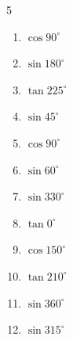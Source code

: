 \begin{multicols}{5}
\begin{enumerate}

  \item $\displaystyle \cos{90^\circ}$

        \phantom{$\displaystyle =0$}

  \item $\displaystyle \sin{180^\circ}$

        \phantom{$\displaystyle =0$}

  \item $\displaystyle \tan{225^\circ}$

        \phantom{$\displaystyle =1$}

  \item $\displaystyle \sin{45^\circ}$


  \item $\displaystyle \cos{90^\circ}$

        \phantom{$\displaystyle =0$}

  \item $\displaystyle \sin{60^\circ}$


  \item $\displaystyle \sin{330^\circ}$


  \item $\displaystyle \tan{0^\circ}$

        \phantom{$\displaystyle =0$}

  \item $\displaystyle \cos{150^\circ}$


\columnbreak %

  \item $\displaystyle \tan{210^\circ}$


  \item $\displaystyle \sin{360^\circ}$

        \phantom{$\displaystyle =0$}

  \item $\displaystyle \sin{315^\circ}$



\end{enumerate}
\end{multicols}
